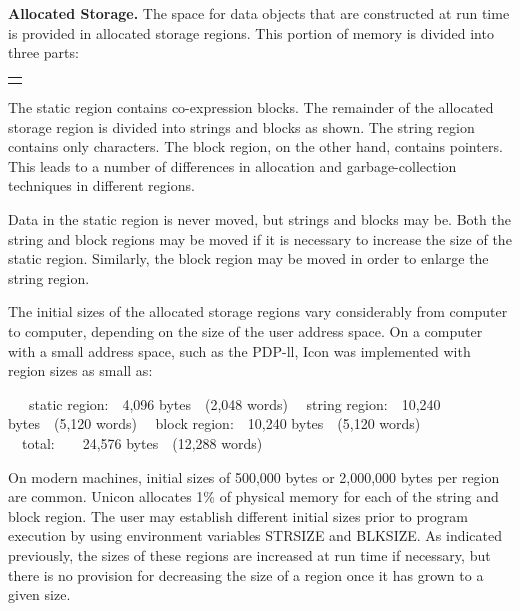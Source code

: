 \textbf{Allocated Storage.} The space for data objects that are
constructed at run time is provided in allocated storage regions. This
portion of memory is divided into three parts:

\begin{center}
\tabletail{}
\tablelasttail{}
\begin{supertabular}{|m{2.2858598in}|}
\hline
\centering{}\\\hline
\centering{}\\\hline
\end{supertabular}
\end{center}

The static region contains co-expression blocks. The remainder of the
allocated storage region is divided into strings and blocks as
shown. The string region contains only characters. The block region,
on the other hand, contains pointers. This leads to a number of
differences in allocation and garbage-collection techniques in
different regions.

Data in the static region is never moved, but strings and blocks may
be. Both the string and block regions may be moved if it is necessary
to increase the size of the static region. Similarly, the block region
may be moved in order to enlarge the string region.

The initial sizes of the allocated storage regions vary considerably
from computer to computer, depending on the size of the user address
space. On a computer with a small address space, such as the PDP-ll,
Icon was implemented with region sizes as small as:

\ \ \ static region:\ \ 4,096 bytes\ \ (2,048 words)\newline
\ \ string region:\ \ 10,240 bytes\ \ (5,120 words)\newline
\ \ block region:\ \ 10,240 bytes\ \ (5,120 words)\newline
\ \ total:\ \ \ \ 24,576 bytes\ \ (12,288 words)

On modern machines, initial sizes of 500,000 bytes or 2,000,000 bytes
per region are common. Unicon allocates 1\% of physical memory for
each of the string and block region. The user may establish different
initial sizes prior to program execution by using environment
variables STRSIZE and BLKSIZE. As indicated previously, the sizes of
these regions are increased at run time if necessary, but there is no
provision for decreasing the size of a region once it has grown to a
given size.

